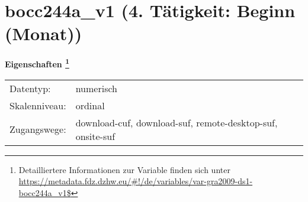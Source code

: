 
    \setcounter{footnote}{0}

    \vspace*{-1.8cm}
	\section{bocc244a\_v1 (4. Tätigkeit: Beginn (Monat))}
	\label{section:bocc244a_v1}



    \vspace*{0.5cm}
    \noindent\textbf{Eigenschaften
	\footnote{Detailliertere Informationen zur Variable finden sich unter
		\url{https://metadata.fdz.dzhw.eu/\#!/de/variables/var-gra2009-ds1-bocc244a_v1$}}}\\
	\begin{tabularx}{\hsize}{@{}lX}
	Datentyp: & numerisch \\
	Skalenniveau: & ordinal \\
	Zugangswege: &
	  download-cuf, 
	  download-suf, 
	  remote-desktop-suf, 
	  onsite-suf
 \\
    \end{tabularx}



